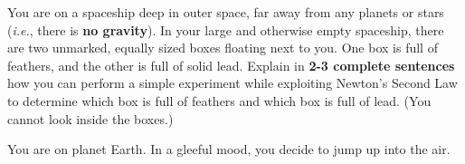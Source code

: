 \begin{questions}
\qsp

\question[2] 
\qsp
{}

\question[3] You are on a spaceship deep in outer space, far away from any planets or stars (\textit{i.e.}, there is \textbf{no gravity}). In your large and otherwise empty spaceship, there are two unmarked, equally sized boxes floating next to you. One box is full of feathers, and the other is full of solid lead. Explain in \textbf{2-3 complete sentences} how you can perform a simple experiment while exploiting Newton's Second Law to determine which box is full of feathers and which box is full of lead. (You cannot look inside the boxes.) 

\qspppp
\qsp


\question[2] You are on planet Earth. In a gleeful mood, you decide to jump up into the air. 

\qspppp



\qsp

\newpage
{}


\end{questions}
